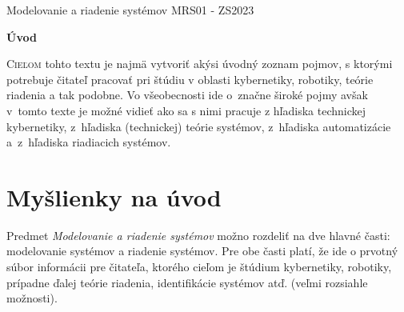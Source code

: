 \documentclass[a4paper, 10pt, ]{article}
\def\oznacenieCasti{MRS01 - ZS2023}
\begin{document}
\lstset{%
style=mystyle,
rangebeginprefix=\#\#\#\ cellB\ ,%
rangebeginsuffix=\ \#\#\#,%
rangeendprefix=\#\#\#\ cellE\ ,%
rangeendsuffix=\ \#\#\#,%
includerangemarker=false,
}





\fontsize{12pt}{22pt}\selectfont

\centerline{\textsf{Modelovanie a riadenie systémov} \hfill \textsf{\oznacenieCasti}}

\fontsize{18pt}{22pt}\selectfont





\begin{flushleft}
	\textbf{\textsf{Úvod}}
\end{flushleft}






\normalsize

\bigskip

{\hypersetup{hidelinks}

\tableofcontents

}

\bigskip

\vspace{18pt}



\noindent
\lettrine[lines=3, nindent=0pt]{C}{ieľom} tohto textu je najmä vytvoriť akýsi úvodný zoznam pojmov, s ktorými potrebuje čitateľ pracovať pri štúdiu v oblasti kybernetiky, robotiky, teórie riadenia a tak podobne. Vo všeobecnosti ide o~značne široké pojmy avšak v~tomto texte je možné vidieť ako sa s nimi pracuje z hľadiska technickej kybernetiky, z~hľadiska (technickej) teórie systémov, z~hľadiska automatizácie a~z~hľadiska riadiacich systémov.








\section{Myšlienky na úvod}

Predmet \emph{Modelovanie a riadenie systémov} možno rozdeliť na dve hlavné časti: modelovanie systémov a riadenie systémov. Pre obe časti platí, že ide o prvotný súbor informácii pre čitateľa, ktorého cieľom je štúdium kybernetiky, robotiky, prípadne ďalej teórie riadenia, identifikácie systémov atď. (veľmi rozsiahle možnosti).
\end{document}
